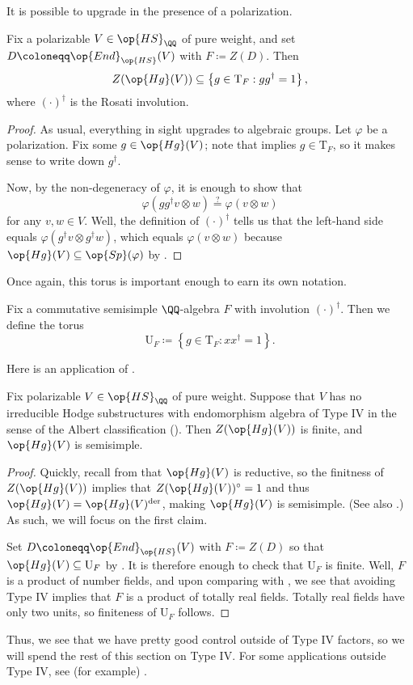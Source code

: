 \documentclass[../thesis.tex]{subfiles}
\begin{document}
It is possible to upgrade  in the presence of a polarization.
\begin{lemma} \label{lem:hg-center-in-u-torus}
	Fix a polarizable $V\in\op{HS}_\QQ$ of pure weight, and set $D\coloneqq\op{End}_{\op{HS}}(V)$ with $F\coloneqq Z(D)$. Then
	\[Z(\op{Hg}(V))\subseteq\left\{g\in\mathrm T_F:gg^\dagger=1\right\},\]
	where $(\cdot)^\dagger$ is the Rosati involution.
\end{lemma}
\begin{proof}
	As usual, everything in sight upgrades to algebraic groups. Let $\varphi$ be a polarization. Fix some $g\in\op{Hg}(V)$; note that  implies $g\in\mathrm T_F$, so it makes sense to write down $g^\dagger$.
	
	Now, by the non-degeneracy of $\varphi$, it is enough to show that
	\[\varphi\left(gg^\dagger v\otimes w\right)\stackrel?=\varphi(v\otimes w)\]
	for any $v,w\in V$. Well, the definition of $(\cdot)^\dagger$ tells us that the left-hand side equals $\varphi\left(g^\dagger v\otimes g^\dagger w\right)$, which equals $\varphi(v\otimes w)$ because $\op{Hg}(V)\subseteq\op{Sp}(\varphi)$ by .
\end{proof}
Once again, this torus is important enough to earn its own notation.
\begin{notation}
	Fix a commutative semisimple $\QQ$-algebra $F$ with involution $(\cdot)^\dagger$. Then we define the torus
	\[\mathrm U_F\coloneqq\left\{g\in\mathrm T_F:xx^\dagger=1\right\}.\]
\end{notation}
Here is an application of .
\begin{proposition} \label{prop:hodge-semisimple-not-type-iv}
	Fix polarizable $V\in\op{HS}_\QQ$ of pure weight. Suppose that $V$ has no irreducible Hodge substructures with endomorphism algebra of Type IV in the sense of the Albert classification (). Then $Z(\op{Hg}(V))$ is finite, and $\op{Hg}(V)$ is semisimple.
\end{proposition}
\begin{proof}
	Quickly, recall from  that $\op{Hg}(V)$ is reductive, so the finitness of $Z(\op{Hg}(V))$ implies that $Z(\op{Hg}(V))^\circ=1$ and thus $\op{Hg}(V)=\op{Hg}(V)^{\mathrm{der}}$, making $\op{Hg}(V)$ is semisimple. (See also \cite[Proposition~19.10]{milne-alg-groups}.) As such, we will focus on the first claim.
	
	Set $D\coloneqq\op{End}_{\op{HS}}(V)$ with $F\coloneqq Z(D)$ so that $\op{Hg}(V)\subseteq\mathrm U_F$ by . It is therefore enough to check that $\mathrm U_F$ is finite. Well, $F$ is a product of number fields, and upon comparing with , we see that avoiding Type IV implies that $F$ is a product of totally real fields. Totally real fields have only two units, so finiteness of $\mathrm U_F$ follows.
\end{proof}
Thus, we see that we have pretty good control outside of Type IV factors, so we will spend the rest of this section on Type IV. For some applications outside Type IV, see (for example) \cite{lombardo-ell-adic-product}.
\end{document}
